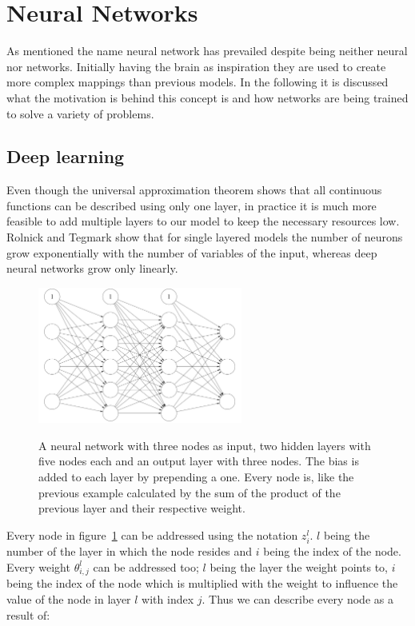\section{Neural Networks}
\label{ch:neural_networks}

As mentioned the name neural network has prevailed despite being neither neural nor networks.
Initially having the brain as inspiration they are used to create more complex mappings than previous models.
In the following it is discussed what the motivation is behind this concept is and how networks are being trained to solve a variety of problems.

\subsection{Deep learning}
\label{ch:deep_learning}

Even though the universal approximation theorem shows that all continuous functions can be described using only one layer, in practice it is much more feasible to add multiple layers to our model to keep the necessary resources low.
Rolnick and Tegmark\cite{Rolnick2017} show that for single layered models the number of neurons grow exponentially with the number of variables of the input, whereas deep neural networks grow only linearly.

\begin{figure}
    \centering
    \caption{ A neural network with three nodes as input, two hidden layers with five nodes each and an output layer with three nodes. The bias is added to each layer by prepending a one. Every node is, like the previous example calculated by the sum of the product of the previous layer and their respective weight. }
    \includegraphics[width=0.6\textwidth]{images/2_nn_with_bias.png}
    \label{fig:nn}
\end{figure}

Every node in figure~\ref{fig:nn} can be addressed using the notation $z^l_i$. $l$ being the number of the layer in which the node resides and $i$ being the index of the node.
Every weight $\theta^l_{i, j}$ can be addressed too; $l$ being the layer the weight points to, $i$ being the index of the node which is multiplied with the weight to influence the value of the node in layer $l$ with index $j$.
Thus we can describe every node as a result of:

